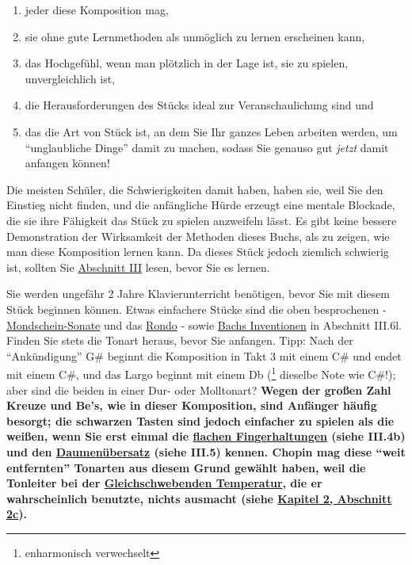 \begin{enumerate}[label={\arabic*.}] 
 \item jeder diese Komposition mag,
 \item sie ohne gute Lernmethoden als unmöglich zu lernen erscheinen kann,
 \item das Hochgefühl, wenn man plötzlich in der Lage ist, sie zu spielen, unvergleichlich ist,
 \item die Herausforderungen des Stücks ideal zur Veranschaulichung sind und
 \item das die Art von Stück ist, an dem Sie Ihr ganzes Leben arbeiten werden, um \enquote{unglaubliche Dinge} damit zu machen, sodass Sie genauso gut \textit{jetzt} damit anfangen können!
 \end{enumerate}
Die meisten Schüler, die Schwierigkeiten damit haben, haben sie, weil Sie den Einstieg nicht finden, und die anfängliche Hürde erzeugt eine mentale Blockade, die sie ihre Fähigkeit das Stück zu spielen anzweifeln lässt.
Es gibt keine bessere Demonstration der Wirksamkeit der Methoden dieses Buchs, als zu zeigen, wie man diese Komposition lernen kann.
Da dieses Stück jedoch ziemlich schwierig ist, sollten Sie \hyperlink{c1iii1}{Abschnitt III} lesen, bevor Sie es lernen.

Sie werden ungefähr 2 Jahre Klavierunterricht benötigen, bevor Sie mit diesem Stück beginnen können.
Etwas einfachere Stücke sind die oben besprochenen - \hyperlink{c1ii25b}{Mondschein-Sonate} und das \hyperlink{c1ii25c}{Rondo} - sowie \hyperlink{c1iii6l2}{Bachs Inventionen} in Abschnitt III.6l.
Finden Sie stets die Tonart heraus, bevor Sie anfangen.
Tipp: Nach der \enquote{Ankündigung} G\# beginnt die Komposition in Takt 3 mit einem C\# und endet mit einem C\#, und das Largo beginnt mit einem Db (\footnote{enharmonisch verwechselt} dieselbe Note wie C\#!); aber sind die beiden in einer Dur- oder Molltonart?
\textbf{Wegen der großen Zahl Kreuze und Be's, wie in dieser Komposition, sind Anfänger häufig besorgt;
die schwarzen Tasten sind jedoch einfacher zu spielen als die weißen, wenn Sie erst einmal die \hyperlink{c1iii4b}{flachen Fingerhaltungen} (siehe III.4b) und den \hyperlink{c1iii5b}{Daumenübersatz} (siehe III.5) kennen.
Chopin mag diese \enquote{weit entfernten} Tonarten aus diesem Grund gewählt haben, weil die Tonleiter bei der \hyperlink{et1}{Gleichschwebenden Temperatur}, die er wahrscheinlich benutzte, nichts ausmacht (siehe \hyperlink{c2_2c}{Kapitel 2, Abschnitt 2c}).}

